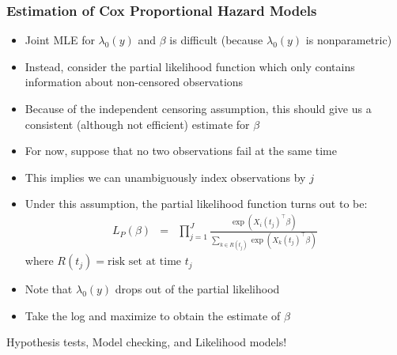 \documentclass{beamer}
\begin{document}
\begin{frame}
\frametitle{Estimation of Cox Proportional Hazard Models}
\small
\vspace{-.5\baselineskip}
\begin{itemize}
  \item Joint MLE for $\lambda_0(y)$ and $\beta$ is difficult (because $\lambda_0(y)$ is nonparametric)
  \item Instead, consider the \alert{partial likelihood function} which only contains
    information about non-censored observations
\pause
  \item Because of the independent censoring assumption, this should give us
    a consistent (although not efficient) estimate for $\beta$
\pause
\smallskip
  \item For now, suppose that no two observations fail at the same time
  \item This implies we can unambiguously index observations by $j$
\pause
\medskip
  \item Under this assumption, the partial likelihood function turns out to be:
  {\footnotesize
    \begin{eqnarray*}
   L_P(\beta) & = & \prod_{j=1}^J \frac{\exp(X_i(t_j)^\top\beta)}
             {\sum_{k\in R(t_j)}\exp(X_{k}(t_j)^\top\beta)}
    \end{eqnarray*}
    where $R(t_j) = \text{risk set at time } t_j$
    }
\pause
  \item Note that $\lambda_0(y)$ drops out of the partial likelihood
\pause
\smallskip
  \item Take the log and maximize to obtain the estimate of $\beta$
\end{itemize}
\end{frame}


\begin{frame}


\huge Hypothesis tests, Model checking, and Likelihood models!

\end{frame}
\end{document}
